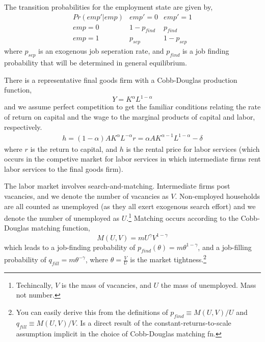 The transition probabilities for the employment state are given by,
\begin{eqnarray*}
 Pr(emp'|emp) & emp'=0 & emp'=1 \\
 emp=0 & 1-p_{find} & p_{find} \\
 emp=1 & p_{sep} & 1-p_{sep}
\end{eqnarray*}
where $p_{sep}$ is an exogenous job seperation rate, and $p_{find}$ is a job finding probability that will be determined in general equilibrium.

There is a representative final goods firm with a Cobb-Douglas production function,
\begin{equation*}
 Y=K^{\alpha} L^{1-\alpha}
\end{equation*}
and we assume perfect competition to get the familiar conditions relating the rate of return on capital and the wage to the marginal products of capital and labor, respectively.
\begin{eqnarray*}
 h=(1-\alpha)A K^{\alpha}L^{-\alpha}
 r=\alpha A K^{\alpha-1} L^{1-\alpha} - \delta
\end{eqnarray*}
where $r$ is the return to capital, and $h$ is the rental price for labor services (which occurs in the competive market for labor services in which intermediate firms rent labor services to the final goods firm).

The labor market involves search-and-matching. Intermediate firms post vacancies, and we denote the number of vacancies as $V$. Non-employed households are all counted as unemployed (as they all exert exogenous search effort) and we denote the number of unemployed as $U$.\footnote{Techincally, $V$ is the mass of vacancies, and $U$ the mass of unemployed. Mass not number.} Matching occurs according to the Cobb-Douglas matching function,
\begin{equation*}
 M(U,V)=m U^{\gamma} V^{1-\gamma}
\end{equation*}
which leads to a job-finding probability of $p_{find}(\theta)=m \theta^{1-\gamma}$, and a job-filling probability of $q_{fill}=m \theta^{-\gamma}$, where $\theta = \frac{V}{U}$ is the market tightness.\footnote{You can easily derive this from the definitions of $p_{find}\equiv M(U,V)/U$ and $q_{fill}\equiv M(U,V)/V$. Is a direct result of the constant-returns-to-scale assumption implicit in the choice of Cobb-Douglas matching fn.}

